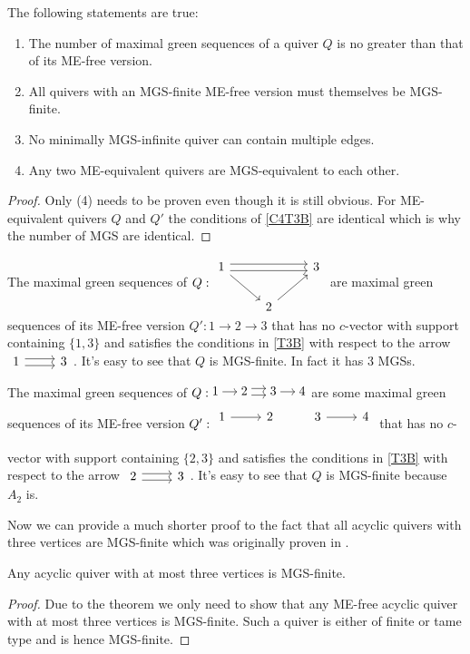 \begin{corollary}\label{C4CB}
The following statements are true:
\begin{enumerate}
\item The number of maximal green sequences of a quiver $Q$ is no greater than that of its ME-free version.
\item All quivers with an MGS-finite ME-free version must themselves be MGS-finite.
\item No minimally MGS-infinite quiver can contain multiple edges.
\item Any two ME-equivalent quivers are MGS-equivalent to each other.
\end{enumerate}
\end{corollary}
\begin{proof}
\indent Only (4) needs to be proven even though it is still obvious. For ME-equivalent quivers $Q$ and $Q'$ the conditions of \ref{C4T3B} are identical which is why the number of MGS are identical.
\end{proof}
\begin{example}
The maximal green sequences of $Q: \begin{tikzcd}
1\righttwicedoublearrow\arrow[rd] &  & 3\\
 & 2\arrow[ur]
\end{tikzcd}$ are maximal green sequences of its ME-free version $Q': 1\to 2\to 3$ that has no $c$-vector with support containing $\{1,3\}$ and satisfies the conditions in \ref{T3B} with respect to the arrow $\begin{tikzcd} 1\rightdoublearrow & 3\end{tikzcd}$. It's easy to see that $Q$ is MGS-finite. In fact it has 3 MGSs.
\end{example}
\begin{example}
The maximal green sequences of $Q: \begin{tikzcd}[cramped, sep=small]
1\arrow[r] & 2 \rightdoublearrow&  3 \arrow[r] & 4\\
\end{tikzcd}$ are some maximal green sequences of its ME-free version $Q': \begin{tikzcd}
1\arrow[r] & 2&  3 \arrow[r] & 4\\
\end{tikzcd}$  that has no $c$-vector with support containing $\{2,3\}$ and satisfies the conditions in \ref{T3B} with respect to the arrow $\begin{tikzcd} 2\rightdoublearrow & 3\end{tikzcd}$. It's easy to see that $Q$ is MGS-finite because $A_2$ is.
\end{example}
\indent Now we can provide a much shorter proof to the fact that all acyclic quivers with three vertices are MGS-finite which was originally proven in \cite{BDP13}.
\begin{corollary}
Any acyclic quiver with at most three vertices is MGS-finite.
\end{corollary}
\begin{proof}
Due to the theorem we only need to show that any ME-free acyclic quiver with at most three vertices is MGS-finite. Such a quiver is either of finite or tame type and is hence MGS-finite.
\end{proof}
